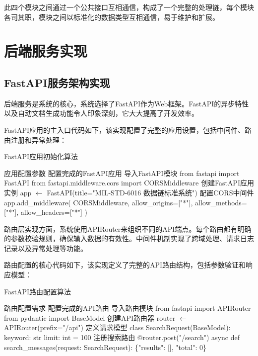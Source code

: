 此四个模块之间通过一个公共接口互相通信，构成了一个完整的处理链，每个模块各司其职，模块之间以标准化的数据类型互相通信，易于维护和扩展。




\section{后端服务实现}

\subsection{FastAPI服务架构实现}

后端服务是系统的核心，系统选择了FastAPI作为Web框架。FastAPI的异步特性以及自动文档生成功能令人印象深刻，它大大提高了开发效率。

FastAPI应用的主入口代码如下，该实现配置了完整的应用设置，包括中间件、路由注册和异常处理：

\begin{algorithm}[H]
\caption{FastAPI应用初始化算法}
\begin{algorithmic}[1]
\REQUIRE 应用配置参数
\ENSURE 配置完成的FastAPI应用
\STATE 导入FastAPI模块
\STATE from fastapi import FastAPI
\STATE from fastapi.middleware.cors import CORSMiddleware
\STATE 创建FastAPI应用实例
\STATE app $\leftarrow$ FastAPI(title="MIL-STD-6016 数据链标准系统")
\STATE 配置CORS中间件
\STATE app.add\_middleware(
\STATE     CORSMiddleware,
\STATE     allow\_origins=["*"],
\STATE     allow\_methods=["*"],
\STATE     allow\_headers=["*"]
\STATE )
\end{algorithmic}
\end{algorithm}

路由层实现方面，系统使用APIRouter来组织不同的API端点。每个路由都有明确的参数校验规则，确保输入数据的有效性。中间件机制实现了跨域处理、请求日志记录以及异常处理等功能。

路由配置的核心代码如下，该实现定义了完整的API路由结构，包括参数验证和响应模型：

\begin{algorithm}[H]
\caption{FastAPI路由配置算法}
\begin{algorithmic}[1]
\REQUIRE 路由配置需求
\ENSURE 配置完成的API路由
\STATE 导入路由模块
\STATE from fastapi import APIRouter
\STATE from pydantic import BaseModel
\STATE 创建API路由器
\STATE router $\leftarrow$ APIRouter(prefix="/api")
\STATE 定义请求模型
\STATE class SearchRequest(BaseModel):
\STATE     keyword: str
\STATE     limit: int = 100
\STATE 注册搜索路由
\STATE @router.post("/search")
\STATE async def search\_messages(request: SearchRequest):
\STATE     \RETURN \{"results": [], "total": 0\}
\end{algorithmic}
\end{algorithm}

